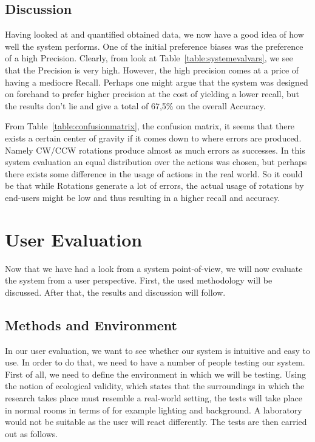 \documentclass[11pt,a4paper]{article}
\begin{document}
\subsection{Discussion}
Having looked at and quantified obtained data, we now have a good idea of how well the system performs. One of the initial preference biases was the preference of a high Precision. Clearly, from look at Table~\ref{table:systemevalvars}, we see that the Precision is very high. However, the high precision comes at a price of having a mediocre Recall. Perhaps one might argue that the system was designed on forehand to prefer higher precision at the cost of yielding a lower recall, but the results don't lie and give a total of 67,5\% on the overall Accuracy.
\par From Table~\ref{table:confusionmatrix}, the confusion matrix, it seems that there exists a certain center of gravity if it comes down to where errors are produced. Namely CW/CCW rotations produce almost as much errors as successes. In this system evaluation an equal distribution over the actions was chosen, but perhaps there exists some difference in the usage of actions in the real world. So it could be that while Rotations generate a lot of errors, the actual usage of rotations by end-users might be low and thus resulting in a higher recall and accuracy.

\section{User Evaluation}
Now that we have had a look from a system point-of-view, we will now evaluate the system from a user perspective. First, the used methodology will be discussed. After that, the results and discussion will follow.

\subsection{Methods and Environment}
\label{sub:userMeth}
In our user evaluation, we want to see whether our system is intuitive and easy to use. In order to do that, we need to have a number of people testing our system. First of all, we need to define the environment in which we will be testing. Using the notion of ecological validity, which states that the surroundings in which the research takes place must resemble a real-world setting\cite{brewer2000research}, the tests will take place in normal rooms in terms of for example lighting and background. A laboratory would not be suitable as the user will react differently. The tests are then carried out as follows. 
\end{document}
